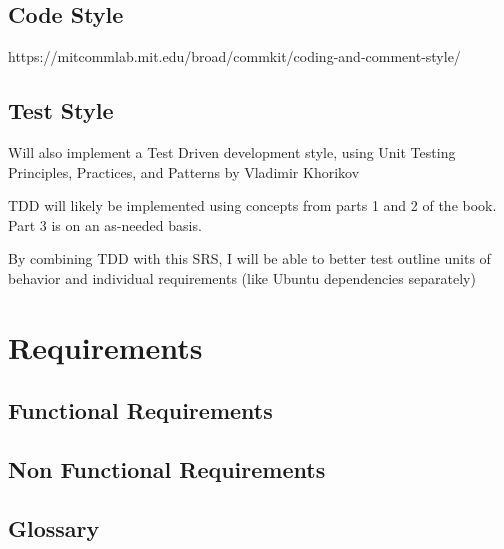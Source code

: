 \section{Code Style}
https://mitcommlab.mit.edu/broad/commkit/coding-and-comment-style/


\section{Test Style}

Will also implement a Test Driven development style, using Unit Testing Principles, Practices, and Patterns by Vladimir Khorikov

TDD will likely be implemented using concepts from parts 1 and 2 of the book. Part 3 is on an as-needed basis.

By combining TDD with this SRS, I will be able to better test outline units of behavior and individual requirements (like Ubuntu dependencies separately)



\newpage




\chapter{Requirements}
\label{Requirements}

\section{Functional Requirements}
\section{Non Functional Requirements}

\begin{appendices}
\chapter{Glossary}


\end{appendices}


